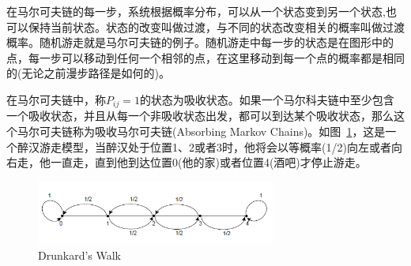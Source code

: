 \documentclass[12pt]{article}
\begin{document}
在马尔可夫链的每一步，系统根据概率分布，可以从一个状态变到另一个状态,也可以保持当前状态。状态的改变叫做过渡，与不同的状态改变相关的概率叫做过渡概率。随机游走就是马尔可夫链的例子。随机游走中每一步的状态是在图形中的点，每一步可以移动到任何一个相邻的点，在这里移动到每一个点的概率都是相同的(无论之前漫步路径是如何的)。

在马尔可夫链中，称$P_{ij}=1$的状态为吸收状态。如果一个马尔科夫链中至少包含一个吸收状态，并且从每一个非吸收状态出发，都可以到达某个吸收状态，那么这个马尔可夫链称为吸收马尔可夫链(Absorbing Markov Chains)。如图~\ref{fig: Drunkard-Walk}，这是一个醉汉游走模型，当醉汉处于位置1、2或者3时，他将会以等概率(1/2)向左或者向右走，他一直走，直到他到达位置0(他的家)或者位置4(酒吧)才停止游走。
\begin{figure}[!ht]
\centering
\includegraphics[width=0.7\textwidth]{Drunkard-Walk.png}
\caption{Drunkard's Walk}
\label{fig: Drunkard-Walk}
\end{figure}






















%


\end{document}
